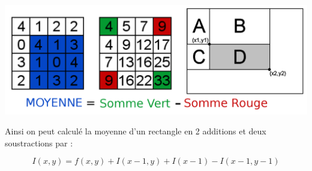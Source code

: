 \begin{center}
\includegraphics[width=\textwidth]{images/imageIntegrale.png}
\end{center}

Ainsi on peut calculé la moyenne d'un rectangle en 2 additions et deux soustractions par :

\begin{equation}
	I(x, y) = f (x, y) + I(x - 1, y) + I(x - 1) - I(x - 1, y - 1)
\end{equation}





%
%


